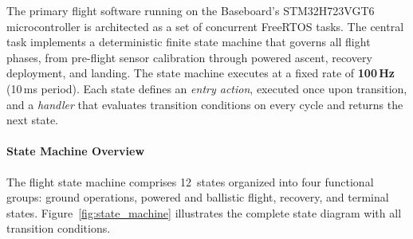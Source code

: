 \newcommand{\cfg}[1]{\texttt{\seqsplit{#1}}}

The primary flight software running on the Baseboard's STM32H723VGT6 microcontroller is architected as a set of concurrent FreeRTOS tasks. The central task implements a deterministic finite state machine that governs all flight phases, from pre-flight sensor calibration through powered ascent, recovery deployment, and landing. The state machine executes at a fixed rate of \textbf{100\,Hz} (10\,ms period). Each state defines an \emph{entry action}, executed once upon transition, and a \emph{handler} that evaluates transition conditions on every cycle and returns the next state.

\paragraph{State Machine Overview}

The flight state machine comprises 12~states organized into four functional groups: ground operations, powered and ballistic flight, recovery, and terminal states. Figure~\ref{fig:state_machine} illustrates the complete state diagram with all transition conditions.

